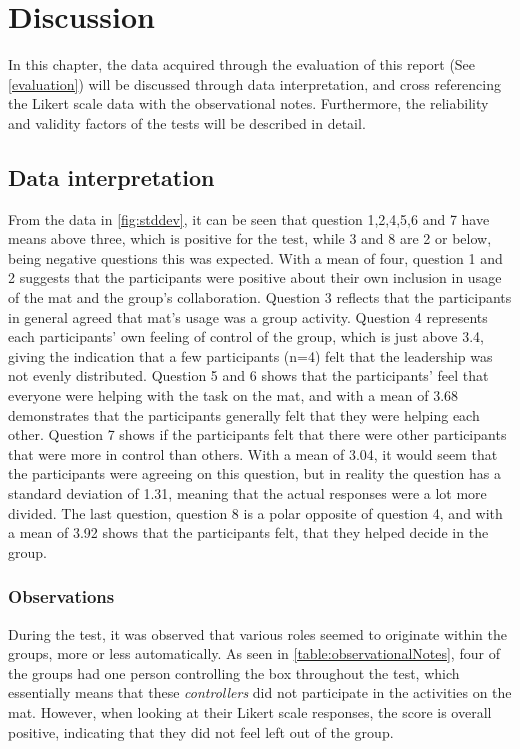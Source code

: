 \chapter{Discussion}
    In this chapter, the data acquired through the evaluation of this report (See \autoref{evaluation}) will be discussed through data interpretation, and cross referencing the Likert scale data with the observational notes. Furthermore, the reliability and validity factors of the tests will be described in detail.

    \section{Data interpretation}
        From the data in \autoref{fig:stddev}, it can be seen that question 1,2,4,5,6 and 7 have means above three, which is positive for the test, while 3 and 8 are 2 or below, being negative questions this was expected. With a mean of four, question 1 and 2 suggests that the participants were positive about their own inclusion in usage of the mat and the group's collaboration. Question 3 reflects that the participants in general agreed that mat's usage was a group activity. Question 4 represents each participants' own feeling of control of the group, which is just above 3.4, giving the indication that a few participants (n=4) felt that the leadership was not evenly distributed. Question 5 and 6 shows that the participants' feel that everyone were helping with the task on the mat, and with a mean of 3.68 demonstrates that the participants generally felt that they were helping each other. Question 7 shows if the participants felt that there were other participants that were more in control than others. With a mean of 3.04, it would seem that the participants were agreeing on this question, but in reality the question has a standard deviation of 1.31, meaning that the actual responses were a lot more divided. The last question, question 8 is a polar opposite of question 4, and with a mean of 3.92 shows that the participants felt, that they helped decide in the group.\\
        
        \subsection{Observations}
            During the test, it was observed that various roles seemed to originate within the groups, more or less automatically. As seen in \autoref{table:observationalNotes}, four of the groups had one person controlling the box throughout the test, which essentially means that these \textit{controllers} did not participate in the activities on the mat. However, when looking at their Likert scale responses, the score is overall positive, indicating that they did not feel left out of the group. 
            
